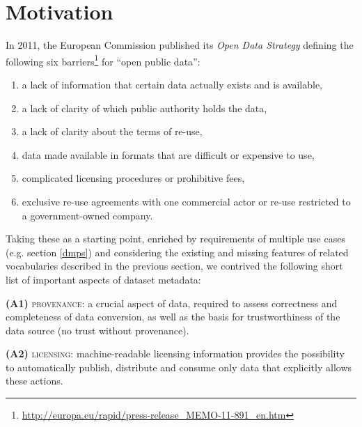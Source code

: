 \documentclass[runningheads,a4paper]{llncs}
\newcommand{\provenance}{{\scshape provenance}\xspace}
\newcommand{\licensing}{{\scshape licensing}\xspace}
\newcommand{\odrl}{{\scshape odrl}\xspace}
\newcommand\footnoteurl[1]{\footnote{\scriptsize\url{#1}}}
\begin{document}
\section{Motivation}
\label{motivation}
In 2011, the European Commission published its \emph{Open Data Strategy} defining the following six barriers\footnoteurl{http://europa.eu/rapid/press-release_MEMO-11-891_en.htm} for “open public data”:
\begin{enumerate} %
\item a lack of information that certain data actually exists and is available,
\item a lack of clarity of which public authority holds the data,
\item a lack of clarity about the terms of re-use,
\item data made available in formats that are difficult or expensive to use,
\item complicated licensing procedures or prohibitive fees,
\item exclusive re-use agreements with one commercial actor or re-use restricted to a government-owned company.
\end{enumerate}

Taking these as a starting point, enriched by requirements of multiple use cases (e.g. section \ref{dmps}) and considering the existing and missing features of related vocabularies described in the previous section, we contrived the following short list of important aspects of dataset metadata:

\textbf{(A1)} \provenance: a crucial aspect of data, required to assess correctness and completeness of data conversion, as well as the basis for trustworthiness of the data source (no trust without provenance).

\textbf{(A2)} \licensing: machine-readable licensing information provides the possibility to automatically
publish, distribute and consume only data that explicitly allows these actions. %
\end{document}
